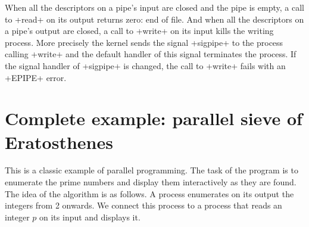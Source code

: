 When all the descriptors on a pipe's input are closed and the pipe is
empty, a call to \ml+read+ on its output returns zero:
end of file. And when all the descriptors on a pipe's output are
closed, a call to \ml+write+ on its input kills the writing
process. More precisely the kernel sends the signal \ml+sigpipe+ to
the process calling \ml+write+ and the default handler of this signal
terminates the process. If the signal handler of \ml+sigpipe+ is
changed, the call to \ml+write+ fails with an \ml+EPIPE+ error.
\newpage

\section{\label{ex/crible}Complete example: parallel sieve of Eratosthenes}

This is a classic example of parallel programming. The task of the
program is to enumerate the prime numbers and display them
interactively as they are found. The idea of the algorithm is as
follows. A process enumerates on its output the integers from 2 onwards. We
connect this process to a  process that reads an
integer $p$ on its input and displays it.


